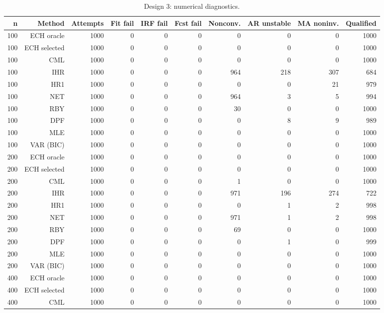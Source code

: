 \begin{table}[p]\centering
\caption{Design 3: numerical diagnostics.}
\small
\begin{tabular}{rrrrrrrrrr}\toprule
n & Method & Attempts & Fit fail & IRF fail & Fcst fail & Nonconv. & AR unstable & MA noninv. & Qualified \\\midrule
100 & ECH oracle & 1000 & 0 & 0 & 0 &   0 &   0 &   0 & 1000 \\
100 & ECH selected & 1000 & 0 & 0 & 0 &   0 &   0 &   0 & 1000 \\
100 & CML & 1000 & 0 & 0 & 0 &   0 &   0 &   0 & 1000 \\
100 & IHR & 1000 & 0 & 0 & 0 & 964 & 218 & 307 &  684 \\
100 & HR1 & 1000 & 0 & 0 & 0 &   0 &   0 &  21 &  979 \\
100 & NET & 1000 & 0 & 0 & 0 & 964 &   3 &   5 &  994 \\
100 & RBY & 1000 & 0 & 0 & 0 &  30 &   0 &   0 & 1000 \\
100 & DPF & 1000 & 0 & 0 & 0 &   0 &   8 &   9 &  989 \\
100 & MLE & 1000 & 0 & 0 & 0 &   0 &   0 &   0 & 1000 \\
100 & VAR (BIC) & 1000 & 0 & 0 & 0 &   0 &   0 &   0 & 1000 \\
200 & ECH oracle & 1000 & 0 & 0 & 0 &   0 &   0 &   0 & 1000 \\
200 & ECH selected & 1000 & 0 & 0 & 0 &   0 &   0 &   0 & 1000 \\
200 & CML & 1000 & 0 & 0 & 0 &   1 &   0 &   0 & 1000 \\
200 & IHR & 1000 & 0 & 0 & 0 & 971 & 196 & 274 &  722 \\
200 & HR1 & 1000 & 0 & 0 & 0 &   0 &   1 &   2 &  998 \\
200 & NET & 1000 & 0 & 0 & 0 & 971 &   1 &   2 &  998 \\
200 & RBY & 1000 & 0 & 0 & 0 &  69 &   0 &   0 & 1000 \\
200 & DPF & 1000 & 0 & 0 & 0 &   0 &   1 &   0 &  999 \\
200 & MLE & 1000 & 0 & 0 & 0 &   0 &   0 &   0 & 1000 \\
200 & VAR (BIC) & 1000 & 0 & 0 & 0 &   0 &   0 &   0 & 1000 \\
400 & ECH oracle & 1000 & 0 & 0 & 0 &   0 &   0 &   0 & 1000 \\
400 & ECH selected & 1000 & 0 & 0 & 0 &   0 &   0 &   0 & 1000 \\
400 & CML & 1000 & 0 & 0 & 0 &   0 &   0 &   0 & 1000 \\

\end{tabular}
\end{table}

